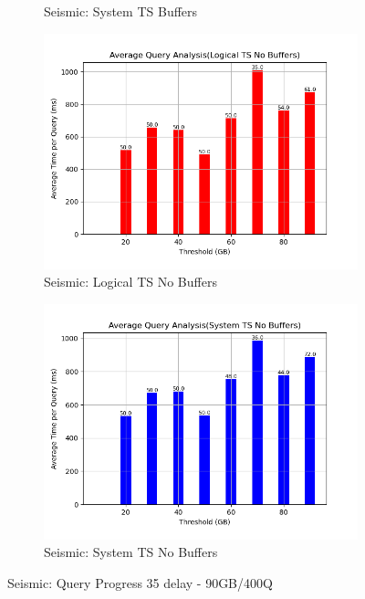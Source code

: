 \begin{figure}
\begin{subfigure}[c]{0.48\textwidth}
		\caption{Seismic: System TS Buffers}
		\label{fig:system-ts-35-seismic}
	\end{subfigure}
	\begin{subfigure}[c]{0.48\textwidth}
		\includegraphics[width=1\textwidth]	 {figures/Experiments/Dynamic/SEISMIC/batch_answering/35/average_query_time_per_batch_version_999777016_10485760_10_delay[35].png}
		\caption{Seismic: Logical TS No Buffers}
		\label{fig:logical-ts-no-35-seismic}
	\end{subfigure}
	\begin{subfigure}[c]{0.48\textwidth}
		\includegraphics[width=1\textwidth]	 {figures/Experiments/Dynamic/SEISMIC/batch_answering/35/average_query_time_per_batch_version_999777017_10485760_10_delay[35].png}
		\caption{Seismic: System TS No Buffers}
		\label{fig:system-ts-no-35-seismic}
	\end{subfigure}
	\caption{Seismic: Query Progress 35 delay - 90GB/400Q}
	\label{fig:query-progress-35-seismic}
\end{figure}
